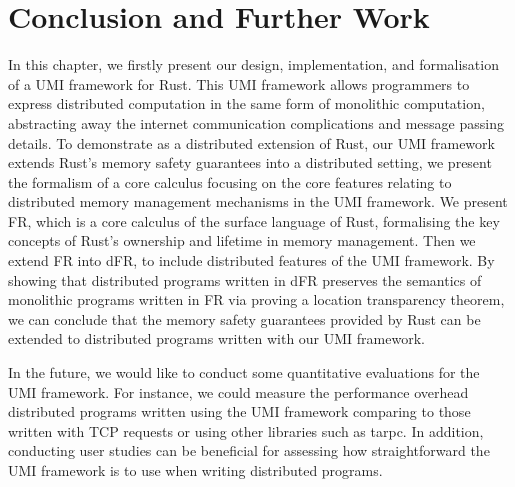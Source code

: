 
\section{Conclusion and Further Work}
\label{chap3:conclusion}
In this chapter, we firstly present our design, implementation, and formalisation of a UMI framework for Rust. This UMI framework allows programmers to express distributed computation in the same form of monolithic computation, abstracting away the internet communication complications and message passing details. To demonstrate as a distributed extension of Rust, our UMI framework extends Rust's memory safety guarantees into a distributed setting, we present the formalism of a core calculus focusing on the core features relating to distributed memory management mechanisms in the UMI framework. We present FR, which is a core calculus of the surface language of Rust, formalising the key concepts of Rust's ownership and lifetime in memory management. Then we extend FR into dFR, to include distributed features of the UMI framework. By showing that distributed programs written in dFR preserves the semantics of monolithic programs written in FR via proving a location transparency theorem, we can conclude that the memory safety guarantees provided by Rust can be extended to distributed programs written with our UMI framework.

\begin{highlightnew}
In the future, we would like to conduct some quantitative evaluations for the UMI framework. For instance, we could measure the performance overhead distributed programs written using the UMI framework comparing to those written with TCP requests or using other libraries such as tarpc. In addition, conducting user studies can be beneficial for assessing how straightforward the UMI framework is to use when writing distributed programs.
\end{highlightnew}

